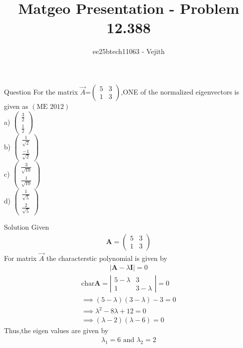 \documentclass{beamer}
\title{Matgeo Presentation - Problem 12.388}
\author{ee25btech11063 - Vejith}
\numberwithin{equation}{section}
\providecommand{\brak}[1]{\ensuremath{\left(#1\right)}}
\theoremstyle{remark}
\newcommand{\myvec}[1]{\ensuremath{\begin{pmatrix}#1\end{pmatrix}}}
\let\vec\mathbf
\begin{document}
\frame{\titlepage}
\begin{frame}{Question}
For the matrix $\Vec{A}$=$\begin{pmatrix}
    5 & 3\\
    1 & 3
\end{pmatrix}$,ONE of the normalized eigenvectors is given as \brak{\text{ME } 2012}\\
        a) \myvec{\frac{3}{2}\\ \frac{1}{2}}\\
        b) \myvec{\frac{1}{\sqrt{2}}\\ \frac{-1}{\sqrt{2}}}\\
        c) \myvec{\frac{3}{\sqrt{10}}\\ \frac{1}{{\sqrt{10}}}}\\
        d) \myvec{\frac{1}{\sqrt{5}}\\ \frac{2}{\sqrt{5}}}\\
\end{frame}

\begin{frame}{Solution}
    Given 
\begin{align}
    \vec{A}=\begin{pmatrix}
    5 & 3\\
    1 & 3
\end{pmatrix}
\end{align}
For matrix $\Vec{A}$ the characterstic polynomial is given by 
\begin{align}
    |\vec{A}-\lambda \vec{I}|=0
\end{align}
\begin{align}
    \text{char}\vec{A}=\left|
\begin{array}{cc}
5-\lambda & 3 \\[6pt]
1 & 3  -\lambda
\end{array}
\right|=0\\
\implies (5- \lambda)( 3- \lambda)-3=0\\
\implies \lambda ^2-8\lambda +12=0\\
\implies (\lambda -2)(\lambda -6)=0
\end{align}
Thus,the eigen values are given by  
\begin{align}
    \lambda_1=6 \text{ and } \lambda_2=2
\end{align}
\end{frame}
\end{document}
